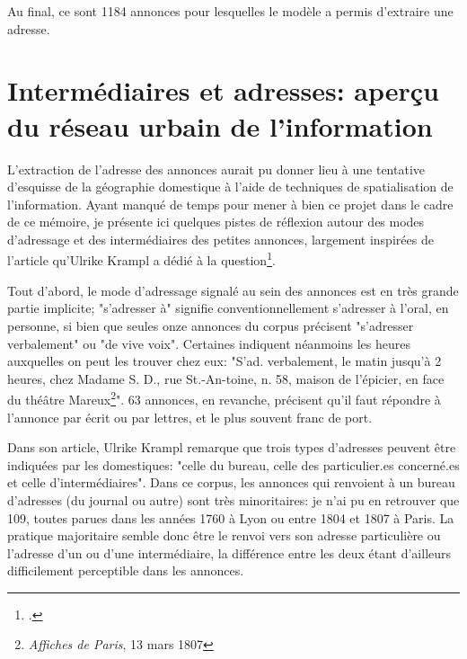 Au final, ce sont 1184 annonces pour lesquelles le modèle a permis d'extraire une adresse. 


\section{Intermédiaires et adresses: aperçu du réseau urbain de l'information}

L'extraction de l'adresse des annonces aurait pu donner lieu à une tentative d'esquisse de la géographie domestique à l'aide de techniques de spatialisation de l'information. Ayant manqué de temps pour mener à bien ce projet dans le cadre de ce mémoire, je présente ici quelques pistes de réflexion autour des modes d'adressage et des intermédiaires des petites annonces, largement inspirées de l'article qu'Ulrike Krampl a dédié à la question\footcites{kramplAdresserClercHuissier2017}. 

Tout d'abord, le mode d'adressage signalé au sein des annonces est en très grande partie implicite; "s'adresser à" signifie conventionnellement s'adresser à l'oral, en personne, si bien que seules onze annonces du corpus précisent "s'adresser verbalement" ou "de vive voix". Certaines indiquent néanmoins les heures auxquelles on peut les trouver chez eux:  "S'ad. verbalement, le matin jusqu'à 2 heures, chez Madame S. D., rue St.-An-toine, n. 58, maison de l'épicier, en face du théâtre Mareux\footnote{\textit{Affiches de Paris}, 13 mars 1807}". 63 annonces, en revanche, précisent qu'il faut répondre à l'annonce par écrit ou par lettres, et le plus souvent franc de port. 

Dans son article, Ulrike Krampl remarque que trois types d'adresses peuvent être indiquées par les domestiques: "celle du bureau, celle des particulier.es concerné.es et celle d’intermédiaires". Dans ce corpus, les annonces qui renvoient à un bureau d'adresses (du journal ou autre) sont très minoritaires: je n'ai pu en retrouver que 109, toutes parues dans les années 1760 à Lyon ou entre 1804 et 1807 à Paris. La pratique majoritaire semble donc être le renvoi vers son adresse particulière ou l'adresse d'un ou d'une intermédiaire, la différence entre les deux étant d'ailleurs difficilement perceptible dans les annonces.

